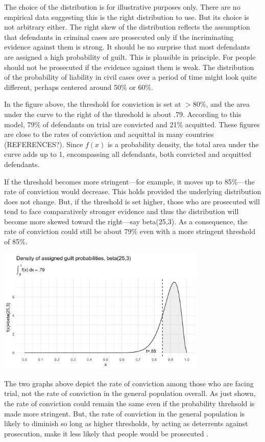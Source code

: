 \documentclass[10pt,dvipsnames,enabledeprecatedfontcommands]{scrartcl}
\begin{document}
The choice of the distribution is for illustrative purposes only. There
are no empirical data suggesting this is the right distribution to use.
But its choice is not arbitrary either. The right skew of the
distribution reflects the assumption that defendants in criminal cases
are prosecuted only if the incriminating evidence against them is
strong. It should be no surprise that most defendants are assigned a
high probability of guilt. This is plausible in principle. For people
should not be prosecuted if the evidence against them is weak. The
distribution of the probability of liability in civil cases over a
period of time might look quite different, perhaps centered around 50\%
or 60\%.

In the figure above, the threshold for conviction is set at \(>80\%\),
and the area under the curve to the right of the threshold is about
\(.79\). According to this model, 79\% of defendants on trial are
convicted and 21\% acquitted. These figures are close to the rates of
conviction and acquittal in many countries (REFERENCES?). Since \(f(x)\)
is a probability density, the total area under the curve adds up to 1,
encompassing all defendants, both convicted and acquitted defendants.

If the threshold becomes more stringent---for example, it moves up to
85\%---the rate of conviction would decrease. This holds provided the
underlying distribution does not change. But, if the threshold is set
higher, those who are prosecuted will tend to face comparatively
stronger evidence and thus the distribution will become more skewed
toward the right---say \textsf{beta(25,3)}. As a consequence, the rate
of conviction could still be about 79\% even with a more stringent
threshold of 85\%.

\begin{center}
    \includegraphics[width=10cm]{dbeta(25,3)2.png}
\end{center}

The two graphs above depict the rate of conviction among those who are
facing trial, not the rate of conviction in the general population
overall. As just shown, the rate of conviction could remain the same
even if the probability threhsold is made more stringent. But, the rate
of conviction in the general population is likely to diminish so long as
higher thresholds, by acting as deterrents against prosecution, make it
less likely that people would be prosecuted .
\end{document}
